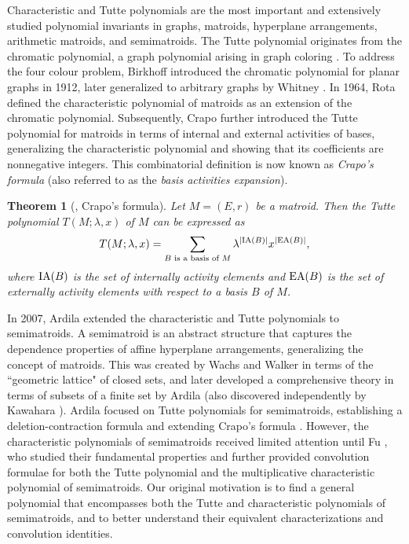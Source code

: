 \documentclass[12pt]{article}%
\numberwithin{equation}{section}
\newtheorem{theorem}{Theorem}[section]
\begin{document}
Characteristic and Tutte polynomials are the most important and extensively studied polynomial invariants in graphs, matroids, hyperplane arrangements, arithmetic matroids, and semimatroids. The Tutte polynomial originates from the chromatic polynomial, a graph polynomial arising in graph coloring \cite{Tutte1954}. To address the four colour problem, Birkhoff  \cite{Birkhoff1912} introduced the chromatic polynomial for planar graphs in 1912, later generalized to arbitrary graphs by Whitney \cite{Whitney1932,Whitney1932-1}. In 1964, Rota  \cite{Rota1964} defined the characteristic polynomial of matroids as an extension of the chromatic polynomial. Subsequently, Crapo \cite{Crapo1969} further introduced the Tutte polynomial for matroids in terms of internal and external activities of bases, generalizing the characteristic polynomial and showing that its coefficients are nonnegative integers. This combinatorial definition is now known as {\em Crapo's formula} (also referred to as the {\em basis activities expansion}).
\begin{theorem}[\cite{Crapo1969}, Crapo's formula] 
Let $M=(E,r)$ be a matroid. Then the Tutte polynomial $T(M;\lambda,x)$ of $M$ can be expressed as
\[
T(M;\lambda,x)=\sum_{B\text{ is a basis of } M}\lambda^{|{\rm IA}(B)|}x^{|{\rm EA}(B)|},
\]
where ${\rm IA}(B)$ is the set of internally activity elements and ${\rm EA}(B)$ is the set of externally activity elements with respect to a basis $B$ of $M$.
\end{theorem}

In 2007, Ardila \cite{Ardila2007} extended the characteristic and Tutte polynomials to semimatroids. A semimatroid is an abstract structure that captures the dependence properties of affine hyperplane arrangements, generalizing the concept of matroids. This was created by Wachs and Walker \cite{Wachs-Walker1986} in terms of the ``geometric lattice" of closed sets, and later developed a comprehensive theory in terms of subsets of a finite set by Ardila \cite{Ardila2007} (also discovered independently by Kawahara \cite{Kawahara2004}). Ardila focused on Tutte polynomials for semimatroids, establishing a deletion-contraction formula \cite[Proposition 8.2]{Ardila2007} and extending Crapo's formula \cite[Theorem 9.5]{Ardila2007}. However, the characteristic polynomials of semimatroids received limited attention until Fu \cite{Fu2025}, who studied their fundamental properties and further provided convolution formulae for both the Tutte polynomial and the multiplicative characteristic polynomial of semimatroids. Our original motivation is to find a general polynomial that encompasses both the Tutte and characteristic polynomials of semimatroids, and to better understand their equivalent characterizations and convolution identities.
\end{document}
